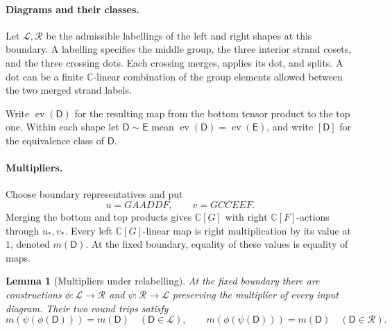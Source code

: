\documentclass[11pt,a4paper]{article}
\numberwithin{equation}{section}
\newtheorem{lemma}[theorem]{Lemma}
\theoremstyle{definition}
\newcommand{\C}{\mathbb C}
\begin{document}
\paragraph{Diagrams and their classes.}
Let \(\mathcal L,\mathcal R\) be the admissible labellings of the left
and right shapes at this boundary. A labelling specifies the middle
group, the three interior strand cosets, and the three crossing
dots. Each crossing merges, applies its dot, and splits. A dot
can be a finite \(\C\)-linear combination of the group elements
allowed between the two merged strand labels.

Write \(\operatorname{ev}(\mathsf D)\) for the resulting map from the
bottom tensor product to the top one. Within each shape let
\(\mathsf D\sim\mathsf E\) mean
\(\operatorname{ev}(\mathsf D)=\operatorname{ev}(\mathsf E)\), and write
\([\mathsf D]\) for the equivalence class of \(\mathsf D\).

\paragraph{Multipliers.}
Choose boundary representatives and put
\[
 u=\boxed{GA}\boxed{AD}\boxed{DF},\qquad
 v=\boxed{GC}\boxed{CE}\boxed{EF}.
\]
Merging the bottom and top products gives \(\C[G]\) with right
\(\C[F]\)-actions through \(u_*,v_*\). Every left \(\C[G]\)-linear map
is right multiplication by its value at \(1\), denoted \(m(\mathsf D)\).
At the fixed boundary, equality of these values is equality of maps.

\begin{lemma}[Multipliers under relabelling]\label{lem:reidemeister-three}
At the fixed boundary there are constructions \(\phi:\mathcal L\to\mathcal R\)
and \(\psi:\mathcal R\to\mathcal L\) preserving the multiplier of every
input diagram. Their two round trips satisfy
\[
 m(\psi(\phi(\mathsf D)))=m(\mathsf D)\quad(\mathsf D\in\mathcal L),
 \qquad
 m(\phi(\psi(\mathsf D)))=m(\mathsf D)\quad(\mathsf D\in\mathcal R).
\]
\end{lemma}
\end{document}
